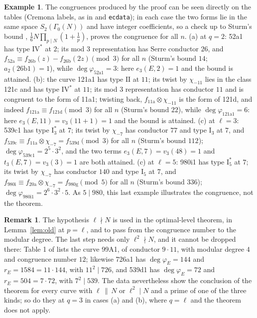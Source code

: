 \documentclass[11pt]{amsart}
\theoremstyle{definition}
\newtheorem{remark}[theorem]{Remark}
\newtheorem{example}[theorem]{Example}
\newcommand{\degphi}{\deg\varphi_E}
\begin{document}
\begin{example}\label{ex:qual}
The congruences produced by the proof can be seen directly on the tables (Cremona labels, as in \cite{Cremona97} and \texttt{ecdata}); in each case the two forms lie in the same space $S_2(\Gamma_0(N))$ and have integer coefficients, so a check up to Sturm's bound \cite{Sturm87}, $\frac16N\prod_{p\mid N}(1+\frac1p)$, proves the congruence for all $n$. (a) at $q=2$: 52a1 has type $\mathrm{IV}^*$ at $2$; its mod $3$ representation has Serre conductor $26$, and $f_{\text{52a}}\equiv f_{\text{26b}}(z)-f_{\text{26b}}(2z)\pmod 3$ for all $n$ (Sturm's bound $14$; $a_2(\text{26b1})=1$), while $\deg\varphi_{\text{52a1}}=3$: here $e_3(E,2)=1$ and the bound is attained. (b): the curve 121a1 has type $\mathrm{II}$ at $11$; its twist by $\chi_{-11}$ lies in the class 121c and has type $\mathrm{IV}^*$ at $11$; its mod $3$ representation has conductor $11$ and is congruent to the form of 11a1; twisting back, $f_{\text{11a}}\otimes\chi_{-11}$ is the form of 121d, and indeed $f_{\text{121a}}\equiv f_{\text{121d}}\pmod 3$ for all $n$ (Sturm's bound $22$), while $\deg\varphi_{\text{121a1}}=6$: here $e_3(E,11)=v_3(11+1)=1$ and the bound is attained. (c) at $\ell=3$: 539c1 has type $\mathrm{I}_3^*$ at $7$; its twist by $\chi_{-7}$ has conductor $77$ and type $\mathrm{I}_3$ at $7$, and $f_{\text{539c}}\equiv f_{\text{11a}}\otimes\chi_{-7}=f_{\text{539d}}\pmod3$ for all $n$ (Sturm's bound $112$); $\deg\varphi_{\text{539c1}}=2^5\cdot3^2$, and the two terms $e_3(E,7)=v_3(48)=1$ and $t_3(E,7)=v_3(3)=1$ are both attained. (c) at $\ell=5$: 980i1 has type $\mathrm{I}_5^*$ at $7$; its twist by $\chi_{-7}$ has conductor $140$ and type $\mathrm{I}_5$ at $7$, and $f_{\text{980i}}\equiv f_{\text{20a}}\otimes\chi_{-7}=f_{\text{980g}}\pmod5$ for all $n$ (Sturm's bound $336$); $\deg\varphi_{\text{980i1}}=2^6\cdot3^2\cdot5$. As $5\mid980$, this last example illustrates the congruence, not the theorem.
\end{example}

\begin{remark}
The hypothesis $\ell\nmid N$ is used in the optimal-level theorem, in Lemma~\ref{lem:old} at $p=\ell$, and to pass from the congruence number to the modular degree. The last step needs only $\ell^2\nmid N$, and it cannot be dropped there: Table 1 of \cite{ARS12} lists the curve 99A1, of conductor $9\cdot11$, with modular degree $4$ and congruence number $12$; likewise 726a1 has $\degphi=144$ and $r_E=1584=11\cdot144$, with $11^2\mid726$, and 539d1 has $\degphi=72$ and $r_E=504=7\cdot72$, with $7^2\mid539$. The data nevertheless show the conclusion of the theorem for every curve with $\ell\,\|\,N$ or $\ell^2\mid N$ and a prime of one of the three kinds; so do they at $q=3$ in cases (a) and (b), where $q=\ell$ and the theorem does not apply.
\end{remark}
\end{document}
